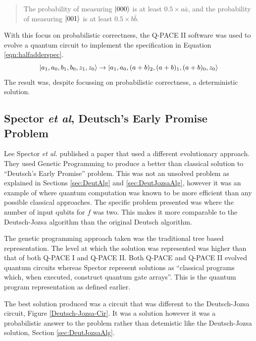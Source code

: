 \begin{quote}
The probability of measuring $\left\vert{000}\right\rangle$ is at least $0.5 \times a\bar{a}$, and the probability of measuring $\left\vert{001}\right\rangle$ is at least $0.5 \times b\bar{b}$.\cite{masseythesis}
\end{quote}

With this focus on probabilistic correctness, the Q-PACE II software was used to evolve a quantum circuit to implement the specification in Equation \ref{eqn:halfadderspec}.
\begin{equation}
 \left\vert{a_1, a_0, b_1, b_0, z_1, z_0}\right\rangle \rightarrow \left\vert{a_1, a_0, (a+b)_2, (a+b)_1, (a+b)_0, z_0}\right\rangle
 \label{eqn:halfadderspec}
\end{equation}
The result was, despite focussing on probabilistic correctness, a deterministic solution\cite{masseythesis}.


\subsection{Spector \emph{et al}, Deutsch's Early Promise Problem}
\label{sec:spectordeutschmajon}
Lee Spector \emph{et al.}\cite{LSpectorGPforQC,LSpectorANDOR,Spector:1999:QCA:316573.317112} published a paper that used a different evolutionary approach.
They used Genetic Programming to produce a better than classical solution to ``Deutsch's Early Promise''\cite{LSpectorGPforQC,LSpectorANDOR,Spector:1999:QCA:316573.317112} problem.
This was not an unsolved problem as explained in Sections \ref{sec:DeutAlg} and \ref{sec:DeutJozsaAlg}, however it was an example of where quantum computation was known to be more efficient than any possible classical approaches.
The specific problem presented was where the number of input qubits for $f$ was two.
This makes it more comparable to the Deutsch-Jozsa algorithm than the original Deutsch algorithm.

The genetic programming approach taken was the traditional tree based representation.
The level at which the solution was represented was higher than that of both Q-PACE I and Q-PACE II.
Both Q-PACE and Q-PACE II evolved quantum circuits whereas Spector represent solutions as ``classical programs which, when executed, construct quantum gate arrays''.
This is the quantum program representation as defined earlier.

The best solution produced was a circuit that was different to the Deutsch-Jozsa circuit, Figure \ref{Deutsch-Jozsa-Cir}.
It was a solution however it was a probabilistic answer to the problem rather than detemistic like the Deutsch-Jozsa solution, Section \ref{sec:DeutJozsaAlg}.

